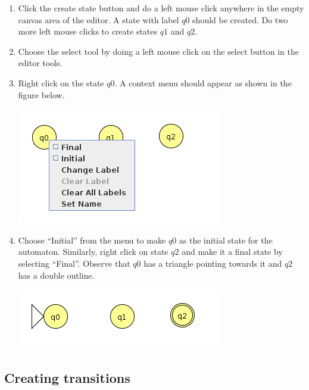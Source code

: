 \documentclass[11pt]{article}
\begin{document}
\begin{enumerate}
  \item Click the create state button and do a left mouse click anywhere in the empty canvas area of the editor. A state with label $q0$ should be created. Do two more left mouse clicks to create states $q1$ and $q2$.
  \item Choose the select tool by doing a left mouse click on the select button in the editor tools.
  \item Right click on the state $q0$. A context menu should appear as shown in the figure below.
  \begin{center}
   \vspace{-0.3cm}\hspace{2em}
   \includegraphics[width=0.4\linewidth]{img/fa_menu.png}
  \label{fig:context}
 \end{center}

 \item Choose ``Initial'' from the menu to make $q0$ as the initial state for the automaton. Similarly, right click on state $q2$ and make it a final state by selecting ``Final''. Observe that $q0$ has a triangle pointing towards it and $q2$ has a double outline.
   \begin{center}
   \vspace{-0.3cm}\hspace{2em}
   \includegraphics[width=0.4\linewidth]{img/fa_fin.png}
  \label{fig:context}
 \end{center}
\end{enumerate}




\subsection{Creating transitions}
\end{document}
